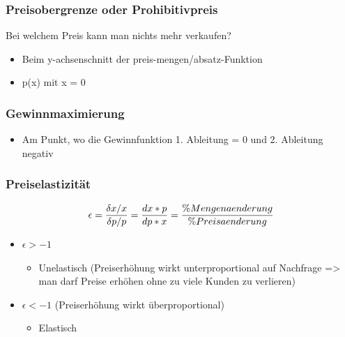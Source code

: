 \documentclass[a4paper]{article}
\begin{document}
    \subsubsection{Preisobergrenze oder Prohibitivpreis}
    Bei welchem Preis kann man nichts mehr verkaufen?
    \begin{itemize}
        \item Beim y-achsenschnitt der preis-mengen/absatz-Funktion
        \item p(x) mit x = 0
    \end{itemize}

    \subsubsection{Gewinnmaximierung}
    \begin{itemize}
        \item Am Punkt, wo die Gewinnfunktion 1. Ableitung = 0 und 2. Ableitung negativ 
    \end{itemize}

    \subsubsection{Preiselastizität}
    \[
        \epsilon = \frac{\delta x / x}{ \delta p / p} = \frac{dx *p}{dp * x} \\
        = \frac{\%Mengenaenderung}{\%Preisaenderung}
    \]
    \begin{itemize}
        \item $\epsilon > -1$
        \begin{itemize}
            \item Unelastisch (Preiserhöhung wirkt
            unterproportional auf Nachfrage => man darf Preise
            erhöhen ohne zu viele Kunden zu verlieren)
        \end{itemize}
        \item $\epsilon < -1 $ (Preiserhöhung wirkt überproportional)
        \begin{itemize}
            \item Elastisch 
        \end{itemize}
    \end{itemize}

    
\end{document}
